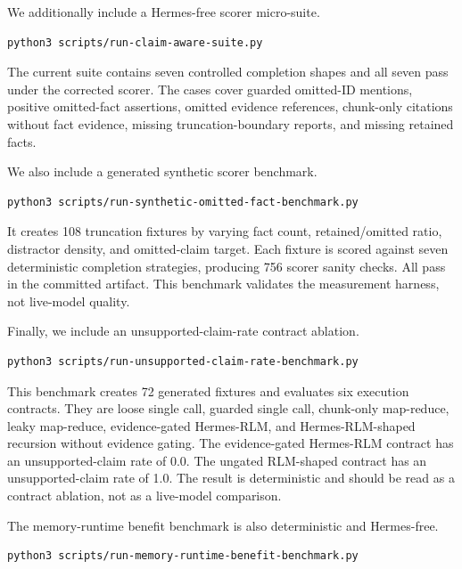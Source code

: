 \documentclass[11pt,a4paper]{article}
\begin{document}
We additionally include a Hermes-free scorer micro-suite.

\begin{lstlisting}[language=bash]
python3 scripts/run-claim-aware-suite.py
\end{lstlisting}

The current suite contains seven controlled completion shapes and all seven
pass under the corrected scorer. The cases cover guarded omitted-ID mentions,
positive omitted-fact assertions, omitted evidence references, chunk-only
citations without fact evidence, missing truncation-boundary reports, and
missing retained facts.

We also include a generated synthetic scorer benchmark.

\begin{lstlisting}[language=bash]
python3 scripts/run-synthetic-omitted-fact-benchmark.py
\end{lstlisting}

It creates 108 truncation fixtures by varying fact count, retained/omitted
ratio, distractor density, and omitted-claim target. Each fixture is scored
against seven deterministic completion strategies, producing 756 scorer
sanity checks. All pass in the committed artifact. This benchmark validates
the measurement harness, not live-model quality.

Finally, we include an unsupported-claim-rate contract ablation.

\begin{lstlisting}[language=bash]
python3 scripts/run-unsupported-claim-rate-benchmark.py
\end{lstlisting}

This benchmark creates 72 generated fixtures and evaluates six execution
contracts. They are loose single call, guarded single call, chunk-only
map-reduce, leaky map-reduce, evidence-gated Hermes-RLM, and
Hermes-RLM-shaped recursion without evidence gating. The evidence-gated
Hermes-RLM contract has an unsupported-claim rate of 0.0. The ungated
RLM-shaped contract has an unsupported-claim rate of 1.0. The result is
deterministic and should be read as a contract ablation, not as a live-model
comparison.

The memory-runtime benefit benchmark is also deterministic and Hermes-free.

\begin{lstlisting}[language=bash]
python3 scripts/run-memory-runtime-benefit-benchmark.py
\end{lstlisting}
\end{document}
